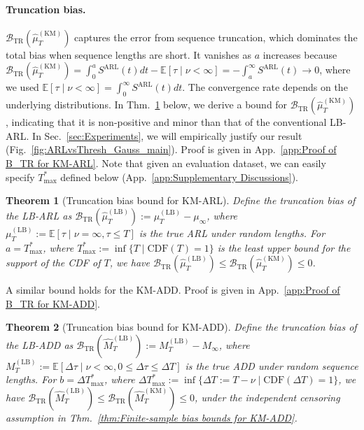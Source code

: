 \documentclass{article}
\theoremstyle{plain}
\newtheorem{theorem}{Theorem}[section]
\theoremstyle{definition}
\theoremstyle{remark}
\def\mbe{\mathbb{E}}
\begin{document}
\paragraph{Truncation bias.}
$\mathcal{B}_\mathrm{TR}(\hat{\mu}_T^\mathrm{(KM)}) $ captures the error from sequence truncation, which dominates the total bias when sequence lengths are short.
It vanishes as 
$a$ increases because 
$\mathcal{B}_\mathrm{TR}(\hat{\mu}_T^\mathrm{(KM)}) 
= \int_0^a S^\mathrm{ARL}(t)dt - \mbe[\tau \mid \nu<\infty] 
= - \int_a^\infty S^\mathrm{ARL}(t) \rightarrow 0$,
where we used $\mbe[\tau \mid \nu<\infty] = \int_0^\infty S^\mathrm{ARL}(t)dt$.
The convergence rate depends on the underlying distributions.
In Thm.~\ref{thm:Truncation bias bounds for KM-ARL} below, we derive a bound for $\mathcal{B}_\mathrm{TR}(\hat{\mu}_T^\mathrm{(KM)})$, indicating that it is non-positive and minor than that of the conventional LB-ARL.
In Sec.~\ref{sec:Experiments}, we will empirically justify our result (Fig.~\ref{fig:ARLvsThresh_Gauss_main}).
Proof is given in App.~\ref{app:Proof of B_TR for KM-ARL}.
Note that given an evaluation dataset, we can easily specify $T_\mathrm{max}^*$ defined below (App.~\ref{app:Supplementary Discussions}).
\begin{theorem}[Truncation bias bound for KM-ARL] \label{thm:Truncation bias bounds for KM-ARL}
    Define the truncation bias of the LB-ARL as $\mathcal{B}_\mathrm{TR}(\hat{\mu}_T^\mathrm{(LB)}) := \mu_T^\mathrm{(LB)} - \mu_\infty$, 
    where $\mu_T^\mathrm{(LB)} := \mbe[ \tau \mid \nu=\infty, \tau \leq T ]$ is the true ARL under random lengths.
    For $a = T_\mathrm{max}^*$, where $T_\mathrm{max}^* := \inf\{T \mid \mathrm{CDF}(T) =1\}$ is the least upper bound for the support of the CDF of $T$, we have
    $\mathcal{B}_\mathrm{TR}(\hat{\mu}_T^\mathrm{(LB)}) \leq \mathcal{B}_\mathrm{TR}(\hat{\mu}_T^\mathrm{(KM)}) \leq 0$.
\end{theorem}

A similar bound holds for the KM-ADD. Proof is given in App.~\ref{app:Proof of B_TR for KM-ADD}.
\begin{theorem}[Truncation bias bound for KM-ADD] \label{thm:Truncation bias bounds for KM-ADD}
    Define the truncation bias of the LB-ADD as $\mathcal{B}_\mathrm{TR}(\hat{M}_T^\mathrm{(LB)}) := M_T^\mathrm{(LB)} - M_\infty$, 
    where $M_T^\mathrm{(LB)} := \mbe[ \Delta \tau \mid \nu < \infty, 0 \leq \Delta \tau \leq \Delta T ]$ is the true ADD under random sequence lengths.
    For $b = \Delta T_\mathrm{max}^*$, where $\Delta T_\mathrm{max}^* := \inf\{ \Delta T := T - \nu \mid \mathrm{CDF}(\Delta T) =1\}$, we have
    $\mathcal{B}_\mathrm{TR}(\hat{M}_T^\mathrm{(LB)}) \leq \mathcal{B}_\mathrm{TR}(\hat{M}_T^\mathrm{(KM)}) \leq 0$, under the independent censoring assumption in Thm.~\ref{thm:Finite-sample bias bounds for KM-ADD}.
\end{theorem}
\end{document}
